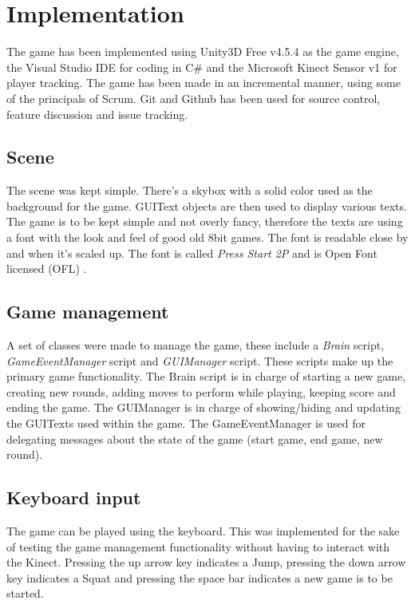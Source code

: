 \documentclass[11pt]{report}
\begin{document}
\chapter{Implementation}
The game has been implemented using Unity3D Free v4.5.4 as the game engine, the Visual Studio IDE for coding in C\# and the Microsoft Kinect Sensor v1 for player tracking.  The game has been made in an incremental manner, using some of the principals of Scrum. Git and Github has been used for source control, feature discussion and issue tracking. 

\section{Scene}
The scene was kept simple. There's a skybox with a solid color used as the background for the game. GUIText objects are then used to display various texts. The game is to be kept simple and not overly fancy, therefore the texts are using a font with the look and feel of good old 8bit games. The font is readable close by and when it's scaled up. The font is called \emph{Press Start 2P} and is Open Font licensed (OFL) \cite{2pfont}. 

\section{Game management}
A set of classes were made to manage the game, these include a \emph{Brain} script, \emph{GameEventManager} script and \emph{GUIManager} script. These scripts make up the primary game functionality. The Brain script is in charge of starting a new game, creating new rounds, adding moves to perform while playing, keeping score and ending the game. The GUIManager is in charge of showing/hiding and updating the GUITexts used within the game. The GameEventManager is used for delegating messages about the state of the game (start game, end game, new round).

\section{Keyboard input}
The game can be played using the keyboard. This was implemented for the sake of testing the game management functionality without having to interact with the Kinect. Pressing the up arrow key indicates a Jump, pressing the down arrow key indicates a Squat and pressing the space bar indicates a new game is to be started.
\end{document}
